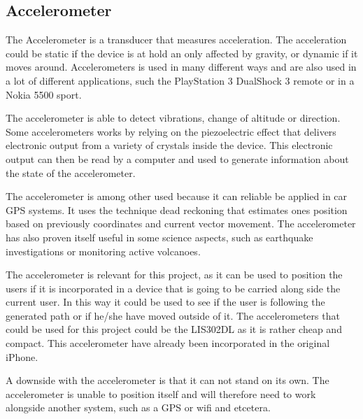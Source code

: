 \subsection{Accelerometer}

The Accelerometer is a transducer that measures acceleration. The acceleration could be static if the device is at hold an only affected by gravity, or dynamic if it moves around\cite{acc_engi}. Accelerometers is used in many different ways and are also used in a lot of different applications, such the PlayStation 3 DualShock 3 remote\cite{acc_ps3} or in a Nokia 5500 sport\cite{acc_nokia}.


The accelerometer is able to detect vibrations, change of altitude or direction\cite{acc_engi}. Some accelerometers works by relying on the piezoelectric effect that delivers electronic output from a variety of crystals inside the device\cite{acc_piezo}. This electronic output can then be read by a computer and used to generate information about the state of the accelerometer.


The accelerometer is among other used because it can reliable be applied in car GPS systems. It uses the technique dead reckoning that estimates ones position based on previously coordinates and current vector movement\cite{acc_dead}. The accelerometer has also proven itself useful in some science aspects, such as earthquake investigations or monitoring active volcanoes\cite{acc_vulkan}. 


The accelerometer is relevant for this project, as it can be used to position the users if it is incorporated in a device that is going to be carried along side the current user. In this way it could be used to see if the user is following the generated path or if he/she have moved outside of it. The accelerometers that could be used for this project could be the LIS302DL as it is rather cheap and compact\cite{acc_price}\cite{acc_LIS302DL}. This accelerometer have already been incorporated in the original iPhone\cite{acc_iPhone}.


A downside with the accelerometer is that it can not stand on its own. The accelerometer is unable to position itself and will therefore need to work alongside another system, such as a GPS or wifi and etcetera. 